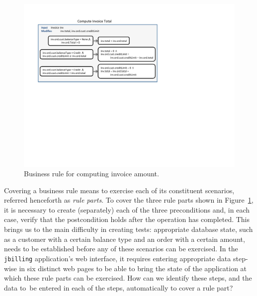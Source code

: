\begin{figure}
\centering
\includegraphics[trim=55 320 286 54,clip,width=\columnwidth]{figs/invoice}
\vspace*{-18pt}
\caption{Business rule for computing invoice amount.}
\label{fig:invoice}
\end{figure}

Covering a business rule means to exercise each of its constituent scenarios,
referred henceforth as \textit{rule parts}.  To cover the three rule parts shown
in Figure~\ref{fig:invoice}, it is necessary to create (separately) each of the
three preconditions and, in each case, verify that the postcondition holds after
the operation has completed.  This brings us to the main difficulty in creating
tests: appropriate database state, such as a customer with a certain balance
type and an order with a certain amount, needs to be established before any of
these scenarios can be exercised.  In the \texttt{jbilling} application's web interface,
it requires entering appropriate data step-wise in six distinct web pages to be able to
bring the state of the application at which these rule parts can be exercised.
How can we identify these steps, and the data to~be entered in
each of the steps, automatically to cover a rule part?

